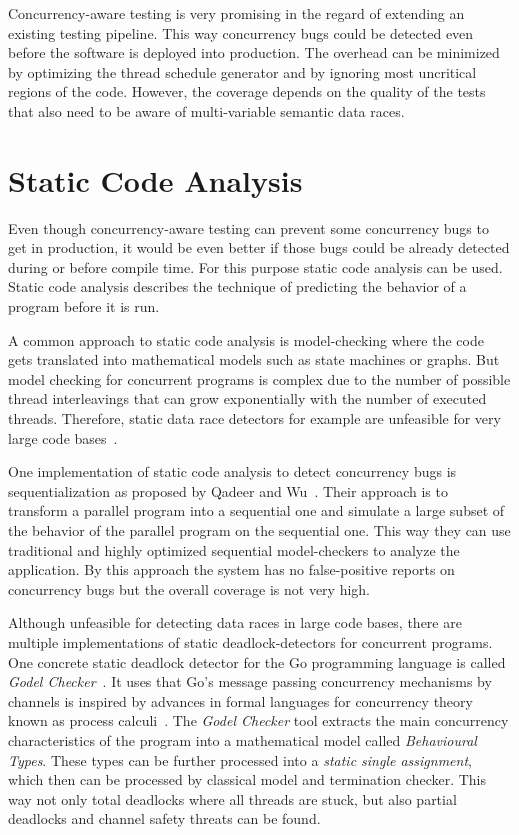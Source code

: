 \documentclass[conference]{IEEEtran}
\begin{document}
Concurrency-aware testing is very promising in the regard of extending an existing testing pipeline.
This way concurrency bugs could be detected even before the software is deployed into production.
The overhead can be minimized by optimizing the thread schedule generator and by ignoring most uncritical regions of the code.
However, the coverage depends on the quality of the tests that also need to be aware of multi-variable semantic data races.


\section{Static Code Analysis}
\label{sct:static}

Even though concurrency-aware testing can prevent some concurrency bugs to get in production, it would be even better if those bugs could be already detected during or before compile time.
For this purpose static code analysis can be used.
Static code analysis describes the technique of predicting the behavior of a program before it is run.

A common approach to static code analysis is model-checking where the code gets translated into mathematical models such as state machines or graphs.
But model checking for concurrent programs is complex due to the number of possible thread interleavings that can grow exponentially with the number of executed threads.
Therefore, static data race detectors for example are unfeasible for very large code bases~\cite{serebry2009threadsanitizer}.

One implementation of static code analysis to detect concurrency bugs is sequentialization as proposed by Qadeer and Wu~\cite{qadeer2004kiss}.
Their approach is to transform a parallel program into a sequential one and simulate a large subset of the behavior of the parallel program on the sequential one.
This way they can use traditional and highly optimized sequential model-checkers to analyze the application.
By this approach the system has no false-positive reports on concurrency bugs but the overall coverage is not very high.

Although unfeasible for detecting data races in large code bases, there are multiple implementations of static deadlock-detectors for concurrent programs.
One concrete static deadlock detector for the Go programming language is called \emph{Godel Checker}~\cite{godelChecker}.
It uses that Go's message passing concurrency mechanisms by channels is inspired by advances in formal languages for concurrency theory known as process calculi~\cite{lange2018verification}.
The \emph{Godel Checker} tool extracts the main concurrency characteristics of the program into a mathematical model called \emph{Behavioural Types}.
These types can be further processed into a \emph{static single assignment}, which then can be processed by classical model and termination checker.
This way not only total deadlocks where all threads are stuck, but also partial deadlocks and channel safety threats can be found.
\end{document}
